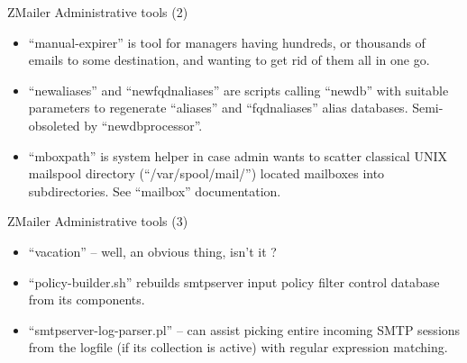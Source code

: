 \documentclass[a4paper,landscape]{slides}
\newcommand{\ZM}{ZMailer}
\begin{document}
\begin{slide}
\centerline{\large \ZM{} Administrative tools (2)}

\begin{itemize}

\item
``manual-expirer'' is tool for managers having hundreds, or
thousands of emails to some destination, and wanting to get rid
of them all in one go.

\item
``newaliases'' and ``newfqdnaliases'' are scripts calling ``newdb''
with suitable parameters to regenerate ``aliases'' and ``fqdnaliases''
alias databases.  Semi-obsoleted by ``newdbprocessor''.

\item
``mboxpath'' is system helper in case admin wants to scatter
classical UNIX mailspool directory (``/var/spool/mail/'') located
mailboxes into subdirectories. See ``mailbox'' documentation.

\end{itemize}
\vfill
\end{slide}

\begin{slide}
\centerline{\large \ZM{} Administrative tools (3)}

\begin{itemize}

\item
``vacation'' -- well, an obvious thing, isn't it ?

\item
``policy-builder.sh'' rebuilds smtpserver input policy filter 
control database from its components.

\item
``smtpserver-log-parser.pl'' -- can assist picking entire incoming
SMTP sessions from the logfile (if its collection is active) with
regular expression matching.
\end{itemize}

\vfill
\end{slide}

\end{document}
